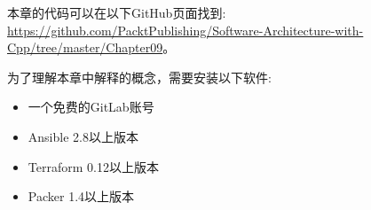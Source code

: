 本章的代码可以在以下GitHub页面找到: \url{https://github.com/PacktPublishing/Software-Architecture-with-Cpp/tree/master/Chapter09}。

为了理解本章中解释的概念，需要安装以下软件:

\begin{itemize}
\item 
一个免费的GitLab账号

\item 
Ansible 2.8以上版本

\item 
Terraform 0.12以上版本

\item 
Packer 1.4以上版本
\end{itemize}

